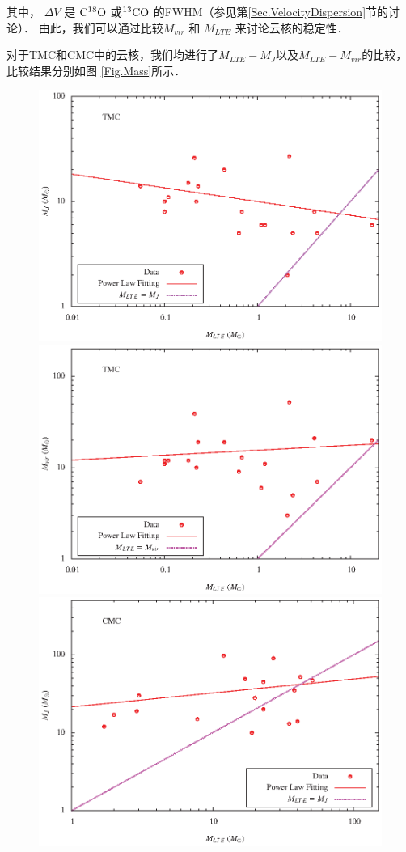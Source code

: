 \documentclass[UTF8, nocolorlinks]{pkuthss}
\newcommand{\cob}{$\rm ^{13}CO$ }
\newcommand{\coc}{$\rm C^{18}O$ }
\begin{document}
     	其中， $\Delta V $ 是 \coc 或\cob 的FWHM（参见第\ref{Sec.VelocityDispersion}节的讨论）． 由此，我们可以通过比较$M_{vir}$ 和 $M_{LTE}$ 来讨论云核的稳定性．

     	对于TMC和CMC中的云核，我们均进行了$M_{LTE}-M_{J}$以及$M_{LTE}-M_{vir}$的比较，比较结果分别如图 \ref{Fig.Mass}所示．

     	\begin{figure}[htbp]
			\includegraphics[totalheight=50mm]{img_plot/M_j_tmc.eps}
			\includegraphics[totalheight=50mm]{img_plot/M_vir_tmc.eps}\\
			\includegraphics[totalheight=50mm]{img_plot/M_j_cmc.eps}

\end{figure}
\end{document}
